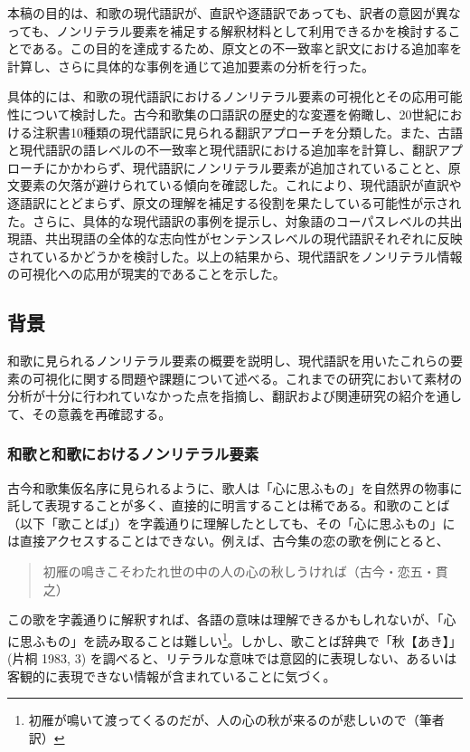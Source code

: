 \documentclass[
  letterpaper,
  DIV=11,
  numbers=noendperiod]{scrartcl}
\begin{document}
本稿の目的は、和歌の現代語訳が、直訳や逐語訳であっても、訳者の意図が異なっても、ノンリテラル要素を補足する解釈材料として利用できるかを検討することである。この目的を達成するため、原文との不一致率と訳文における追加率を計算し、さらに具体的な事例を通じて追加要素の分析を行った。

具体的には、和歌の現代語訳におけるノンリテラル要素の可視化とその応用可能性について検討した。古今和歌集の口語訳の歴史的な変遷を俯瞰し、20世紀における注釈書10種類の現代語訳に見られる翻訳アプローチを分類した。また、古語と現代語訳の語レベルの不一致率と現代語訳における追加率を計算し、翻訳アプローチにかかわらず、現代語訳にノンリテラル要素が追加されていることと、原文要素の欠落が避けられている傾向を確認した。これにより、現代語訳が直訳や逐語訳にとどまらず、原文の理解を補足する役割を果たしている可能性が示された。さらに、具体的な現代語訳の事例を提示し、対象語のコーパスレベルの共出現語、共出現語の全体的な志向性がセンテンスレベルの現代語訳それぞれに反映されているかどうかを検討した。以上の結果から、現代語訳をノンリテラル情報の可視化への応用が現実的であることを示した。

\subsection{背景}\label{ux80ccux666f}

和歌に見られるノンリテラル要素の概要を説明し、現代語訳を用いたこれらの要素の可視化に関する問題や課題について述べる。これまでの研究において素材の分析が十分に行われていなかった点を指摘し、翻訳および関連研究の紹介を通して、その意義を再確認する。

\subsubsection{和歌と和歌におけるノンリテラル要素}\label{ux548cux6b4cux3068ux548cux6b4cux306bux304aux3051ux308bux30ceux30f3ux30eaux30c6ux30e9ux30ebux8981ux7d20}

古今和歌集仮名序に見られるように、歌人は「心に思ふもの」を自然界の物事に託して表現することが多く、直接的に明言することは稀である。和歌のことば（以下「歌ことば」）を字義通りに理解したとしても、その「心に思ふもの」には直接アクセスすることはできない。例えば、古今集の恋の歌を例にとると、

\begin{quote}
初雁の鳴きこそわたれ世の中の人の心の秋しうければ（古今・恋五・貫之）
\end{quote}

この歌を字義通りに解釈すれば、各語の意味は理解できるかもしれないが、「心に思ふもの」を読み取ることは難しい\footnote{初雁が鳴いて渡ってくるのだが、人の心の秋が来るのが悲しいので（筆者訳）}。しかし、歌ことば辞典で「秋【あき】」(片桐
1983, 3)
を調べると、リテラルな意味では意図的に表現しない、あるいは客観的に表現できない情報が含まれていることに気づく。
\end{document}
